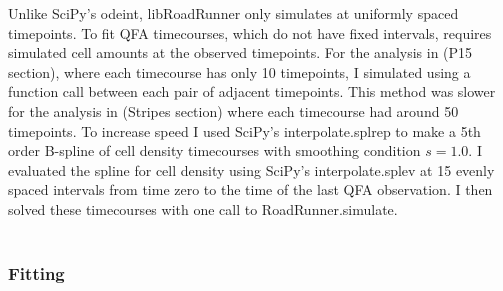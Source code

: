 
Unlike SciPy's odeint, libRoadRunner only simulates at uniformly
spaced timepoints. To fit QFA timecourses, which do not have fixed
intervals, requires simulated cell amounts at the observed
timepoints. For the analysis in (P15 section), where each timecourse
has only 10 timepoints, I simulated using a function call between each
pair of adjacent timepoints. This method was slower for the analysis
in (Stripes section) where each timecourse had around 50
timepoints. To increase speed I used SciPy's interpolate.splrep to
make a 5th order B-spline of cell density timecourses with smoothing
condition \(s=1.0\). I evaluated the spline for cell density using
SciPy's interpolate.splev at 15 evenly spaced intervals from time zero
to the time of the last QFA observation. I then solved these
timecourses with one call to RoadRunner.simulate.\\\\

\subsubsection{Fitting}

